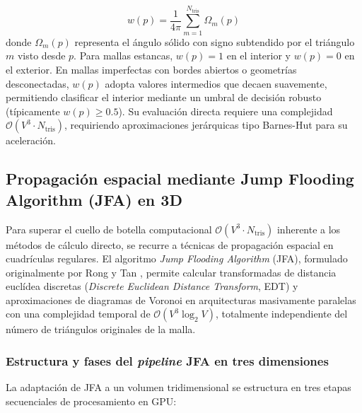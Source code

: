 \begin{itemize}
  \begin{equation}
    w(p) = \frac{1}{4\pi} \sum_{m=1}^{N_{\text{tris}}} \Omega_m(p)
  \end{equation}
  donde $\Omega_m(p)$ representa el ángulo sólido con signo subtendido por el triángulo $m$ visto desde $p$. Para mallas estancas, $w(p) = 1$ en el interior y $w(p) = 0$ en el exterior. En mallas imperfectas con bordes abiertos o geometrías desconectadas, $w(p)$ adopta valores intermedios que decaen suavemente, permitiendo clasificar el interior mediante un umbral de decisión robusto (típicamente $w(p) \ge 0.5$). Su evaluación directa requiere una complejidad $\mathcal{O}(V^3 \cdot N_{\text{tris}})$, requiriendo aproximaciones jerárquicas tipo Barnes-Hut para su aceleración.
\end{itemize}

\subsection{Propagación espacial mediante Jump Flooding Algorithm (JFA) en 3D}

Para superar el cuello de botella computacional $\mathcal{O}(V^3 \cdot N_{\text{tris}})$ inherente a los métodos de cálculo directo, se recurre a técnicas de propagación espacial en cuadrículas regulares. El algoritmo \textit{Jump Flooding Algorithm} (JFA), formulado originalmente por Rong y Tan \cite{rong2006}, permite calcular transformadas de distancia euclídea discretas (\textit{Discrete Euclidean Distance Transform}, EDT) y aproximaciones de diagramas de Voronoi en arquitecturas masivamente paralelas con una complejidad temporal de $\mathcal{O}(V^3 \log_2 V)$, totalmente independiente del número de triángulos originales de la malla.

\subsubsection{Estructura y fases del \textit{pipeline} JFA en tres dimensiones}

La adaptación de JFA a un volumen tridimensional se estructura en tres etapas secuenciales de procesamiento en GPU:

